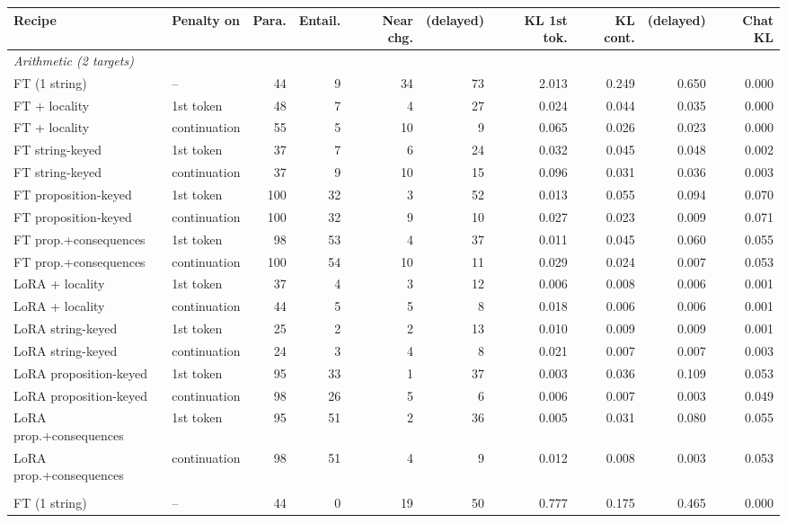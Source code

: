 \begin{tabular}{llrrrrrrrr}
\toprule
Recipe & Penalty on & Para. & Entail. & Near chg. & (delayed) & KL 1st tok. & KL cont. & (delayed) & Chat KL \\
\midrule
\multicolumn{10}{l}{\emph{Arithmetic (2 targets)}} \\
FT (1 string) & -- & 44 & 9 & 34 & 73 & 2.013 & 0.249 & 0.650 & 0.000 \\
FT + locality & 1st token & 48 & 7 & 4 & 27 & 0.024 & 0.044 & 0.035 & 0.000 \\
FT + locality & continuation & 55 & 5 & 10 & 9 & 0.065 & 0.026 & 0.023 & 0.000 \\
FT string-keyed & 1st token & 37 & 7 & 6 & 24 & 0.032 & 0.045 & 0.048 & 0.002 \\
FT string-keyed & continuation & 37 & 9 & 10 & 15 & 0.096 & 0.031 & 0.036 & 0.003 \\
FT proposition-keyed & 1st token & 100 & 32 & 3 & 52 & 0.013 & 0.055 & 0.094 & 0.070 \\
FT proposition-keyed & continuation & 100 & 32 & 9 & 10 & 0.027 & 0.023 & 0.009 & 0.071 \\
FT prop.+consequences & 1st token & 98 & 53 & 4 & 37 & 0.011 & 0.045 & 0.060 & 0.055 \\
FT prop.+consequences & continuation & 100 & 54 & 10 & 11 & 0.029 & 0.024 & 0.007 & 0.053 \\
LoRA + locality & 1st token & 37 & 4 & 3 & 12 & 0.006 & 0.008 & 0.006 & 0.001 \\
LoRA + locality & continuation & 44 & 5 & 5 & 8 & 0.018 & 0.006 & 0.006 & 0.001 \\
LoRA string-keyed & 1st token & 25 & 2 & 2 & 13 & 0.010 & 0.009 & 0.009 & 0.001 \\
LoRA string-keyed & continuation & 24 & 3 & 4 & 8 & 0.021 & 0.007 & 0.007 & 0.003 \\
LoRA proposition-keyed & 1st token & 95 & 33 & 1 & 37 & 0.003 & 0.036 & 0.109 & 0.053 \\
LoRA proposition-keyed & continuation & 98 & 26 & 5 & 6 & 0.006 & 0.007 & 0.003 & 0.049 \\
LoRA prop.+consequences & 1st token & 95 & 51 & 2 & 36 & 0.005 & 0.031 & 0.080 & 0.055 \\
LoRA prop.+consequences & continuation & 98 & 51 & 4 & 9 & 0.012 & 0.008 & 0.003 & 0.053 \\
\addlinespace[2pt]
\multicolumn{10}{l}{\emph{Capital (France)}} \\
FT (1 string) & -- & 44 & 0 & 19 & 50 & 0.777 & 0.175 & 0.465 & 0.000 \\

\end{tabular}
